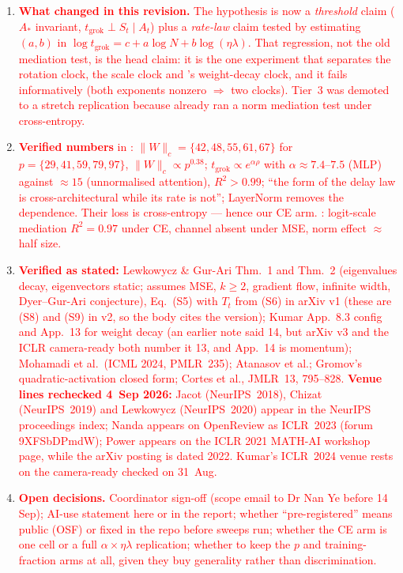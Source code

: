 \documentclass[a4paper,11pt]{article} %
\newcommand{\tgrok}{t_{\mathrm{grok}}}
\begin{document}
\begin{enumerate}[1.]
  \item \textcolor{red}{\textbf{What changed in this revision.} The hypothesis is now a \emph{threshold} claim ($A_*$ invariant, $\tgrok \perp S_t \mid A_t$) plus a \emph{rate-law} claim tested by estimating $(a,b)$ in $\log\tgrok = c + a\log N + b\log(\eta\lambda)$. That regression, not the old mediation test, is the head claim: it is the one experiment that separates the rotation clock, the scale clock and \citeauthor{kim2026clock}'s weight-decay clock, and it fails informatively (both exponents nonzero $\Rightarrow$ two clocks). Tier~3 was demoted to a stretch replication because \citet{truong2026logit} already ran a norm mediation test under cross-entropy.}
  \item \textcolor{red}{\textbf{Verified numbers} in \citet{truong2026norm}: $\lVert W\rVert_c=\{42,48,55,61,67\}$ for $p=\{29,41,59,79,97\}$, $\lVert W\rVert_c\propto p^{0.38}$; $\tgrok\propto e^{\alpha\rho}$ with $\alpha\approx7.4$--$7.5$ (MLP) against ${\approx}15$ (unnormalised attention), $R^2>0.99$; ``the form of the delay law is cross-architectural while its rate is not''; LayerNorm removes the dependence. Their loss is cross-entropy --- hence our CE arm. \citet{truong2026logit}: logit-scale mediation $R^2=0.97$ under CE, channel absent under MSE, norm effect ${\approx}$ half size.}
  \item \textcolor{red}{\textbf{Verified as stated:} Lewkowycz \& Gur-Ari Thm.~1 and Thm.~2 (eigenvalues decay, eigenvectors static; assumes MSE, $k\ge2$, gradient flow, infinite width, Dyer--Gur-Ari conjecture), Eq.~(S5) with $T_t$ from (S6) in arXiv v1 (these are (S8) and (S9) in v2, so the body cites the version); Kumar App.~8.3 config and App.~13 for weight decay (an earlier note said 14, but arXiv v3 and the ICLR camera-ready both number it 13, and App.~14 is momentum); Mohamadi et al.\ (ICML 2024, PMLR~235); Atanasov et al.; Gromov's quadratic-activation closed form; Cortes et al., JMLR~13, 795--828.  \textbf{Venue lines rechecked 4~Sep 2026:} Jacot (NeurIPS~2018), Chizat (NeurIPS~2019) and Lewkowycz (NeurIPS~2020) appear in the NeurIPS proceedings index; Nanda appears on OpenReview as ICLR~2023 (forum 9XFSbDPmdW); Power appears on the ICLR 2021 MATH-AI workshop page, while the arXiv posting is dated 2022. Kumar's ICLR~2024 venue rests on the camera-ready checked on 31~Aug.}
  \item \textcolor{red}{\textbf{Open decisions.} Coordinator sign-off (scope email to Dr Nan Ye before 14 Sep); AI-use statement here or in the report; whether ``pre-registered'' means public (OSF) or fixed in the repo before sweeps run; whether the CE arm is one cell or a full $\alpha\times\eta\lambda$ replication; whether to keep the $p$ and training-fraction arms at all, given they buy generality rather than discrimination.}

\end{enumerate}
\end{document}
